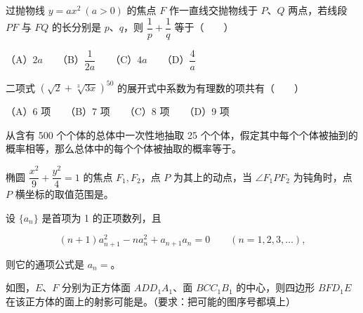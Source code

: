 \begin{question}
过抛物线 $y=ax^2\ (a>0)$ 的焦点 $F$ 作一直线交抛物线于 $P$、$Q$ 两点，若线段 $PF$ 与 $FQ$ 的长分别是 $p$、$q$，则 $\dfrac1p+\dfrac1q$ 等于\mbox{（　　）}

（A）$2a$　　（B）$\dfrac1{2a}$　　（C）$4a$　　（D）$\dfrac4a$

\end{question}
\begin{question}
二项式 $\left(\sqrt2+\sqrt[3]{3x}\right)^{50}$ 的展开式中系数为有理数的项共有\mbox{（　　）}

（A）6 项　　（B）7 项　　（C）8 项　　（D）9 项

\end{question}

\begin{question}
从含有 500 个个体的总体中一次性地抽取 25 个个体，假定其中每个个体被抽到的概率相等，那么总体中的每个个体被抽取的概率等于\gkblank{}。

\end{question}
\begin{question}
椭圆 $\dfrac{x^2}{9}+\dfrac{y^2}{4}=1$ 的焦点 $F_1,F_2$，点 $P$ 为其上的动点，当 $\angle F_1PF_2$ 为钝角时，点 $P$ 横坐标的取值范围是\gkblank{}。

\end{question}
\begin{question}
设 $\{a_n\}$ 是首项为 1 的正项数列，且

\nopagebreak[4]
\[
(n+1)a_{n+1}^2-na_n^2+a_{n+1}a_n=0
\qquad(n=1,2,3,\ldots),
\]

则它的通项公式是 $a_n=$\gkblank{}。

\Needspace{0.4\textheight}
\end{question}
\begin{question}
如图，$E$、$F$ 分别为正方体面 $ADD_1A_1$、面 $BCC_1B_1$ 的中心，则四边形 $BFD_1E$ 在该正方体的面上的射影可能是\gkblank{}。（要求：把可能的图序号都填上）
\nopagebreak[4]
\begin{center}\end{center}
\nopagebreak[4]
\end{question}

